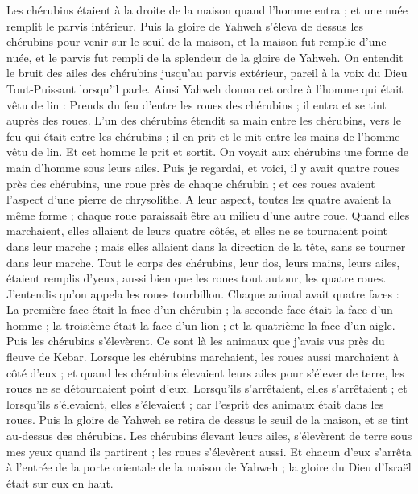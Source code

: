 \begin{multicols}{2}
Les chérubins étaient à la droite de la maison quand l'homme entra ; et une nuée remplit le parvis intérieur.
Puis la gloire de Yahweh s'éleva de dessus les chérubins pour venir sur le seuil de la maison, et la maison fut remplie d'une nuée, et le parvis fut rempli de la splendeur de la gloire de Yahweh.
On entendit le bruit des ailes des chérubins jusqu'au parvis extérieur, pareil à la voix du Dieu Tout-Puissant lorsqu’il parle.
Ainsi Yahweh donna cet ordre à l'homme qui était vêtu de lin : Prends du feu d’entre les roues des chérubins ; il entra et se tint auprès des roues.
L'un des chérubins étendit sa main entre les chérubins, vers le feu qui était entre les chérubins ; il en prit et le mit entre les mains de l'homme vêtu de lin. Et cet homme le prit et sortit.
On voyait aux chérubins une forme de main d'homme sous leurs ailes.
Puis je regardai, et voici, il y avait quatre roues près des chérubins, une roue près de chaque chérubin ; et ces roues avaient l’aspect d'une pierre de chrysolithe.
A leur aspect, toutes les quatre avaient la même forme ; chaque roue paraissait être au milieu d'une autre roue.
Quand elles marchaient, elles allaient de leurs quatre côtés, et elles ne se tournaient point dans leur marche ; mais elles allaient dans la direction de la tête, sans se tourner dans leur marche.
Tout le corps des chérubins, leur dos, leurs mains, leurs ailes, étaient remplis d'yeux, aussi bien que les roues tout autour, les quatre roues.
J’entendis qu’on appela les roues tourbillon.
Chaque animal avait quatre faces : La première face était la face d'un chérubin ; la seconde face était la face d'un homme ; la troisième était la face d'un lion ; et la quatrième la face d'un aigle.
Puis les chérubins s'élevèrent. Ce sont là les animaux que j'avais vus près du fleuve de Kebar.
Lorsque les chérubins marchaient, les roues aussi marchaient à côté d'eux ; et quand les chérubins élevaient leurs ailes pour s'élever de terre, les roues ne se détournaient point d'eux.
Lorsqu'ils s'arrêtaient, elles s'arrêtaient ; et lorsqu'ils s'élevaient, elles s'élevaient ; car l'esprit des animaux était dans les roues.
Puis la gloire de Yahweh se retira de dessus le seuil de la maison, et se tint au-dessus des chérubins.
Les chérubins élevant leurs ailes, s'élevèrent de terre sous mes yeux quand ils partirent ; les roues s'élevèrent aussi. Et chacun d'eux s'arrêta à l'entrée de la porte orientale de la maison de Yahweh ; la gloire du Dieu d'Israël était sur eux en haut.

\end{multicols}
